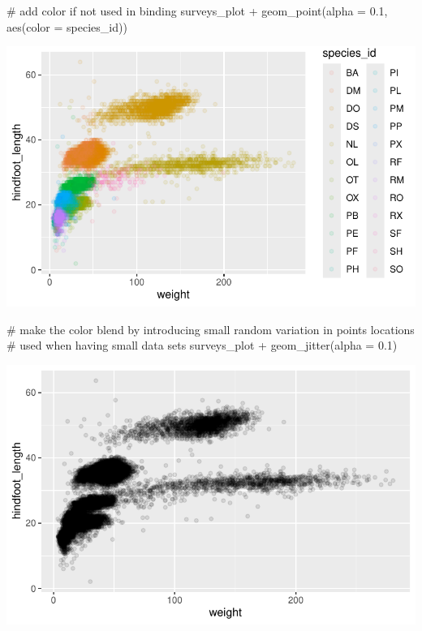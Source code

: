 \documentclass[
  letterpaper,
  DIV=11,
  numbers=noendperiod]{scrreprt}
\newenvironment{Shaded}{\begin{snugshade}}{\end{snugshade}}
\newcommand{\AttributeTok}[1]{\textcolor[rgb]{0.40,0.45,0.13}{#1}}
\newcommand{\CommentTok}[1]{\textcolor[rgb]{0.37,0.37,0.37}{#1}}
\newcommand{\FloatTok}[1]{\textcolor[rgb]{0.68,0.00,0.00}{#1}}
\newcommand{\FunctionTok}[1]{\textcolor[rgb]{0.28,0.35,0.67}{#1}}
\newcommand{\NormalTok}[1]{\textcolor[rgb]{0.00,0.23,0.31}{#1}}
\newcommand{\SpecialCharTok}[1]{\textcolor[rgb]{0.37,0.37,0.37}{#1}}
\begin{document}
\begin{Shaded}
\begin{Highlighting}[]
\CommentTok{\# add color if not used in binding}
\NormalTok{surveys\_plot }\SpecialCharTok{+} \FunctionTok{geom\_point}\NormalTok{(}\AttributeTok{alpha =} \FloatTok{0.1}\NormalTok{, }\FunctionTok{aes}\NormalTok{(}\AttributeTok{color =}\NormalTok{ species\_id))}
\end{Highlighting}
\end{Shaded}

\includegraphics{src/notebooks/r_files/figure-pdf/unnamed-chunk-49-4.pdf}

\begin{Shaded}
\begin{Highlighting}[]
\CommentTok{\# make the color blend by introducing small random variation in points locations}
\CommentTok{\# used when having small data sets}
\NormalTok{surveys\_plot }\SpecialCharTok{+} \FunctionTok{geom\_jitter}\NormalTok{(}\AttributeTok{alpha =} \FloatTok{0.1}\NormalTok{)}
\end{Highlighting}
\end{Shaded}

\includegraphics{src/notebooks/r_files/figure-pdf/unnamed-chunk-49-5.pdf}
\end{document}
